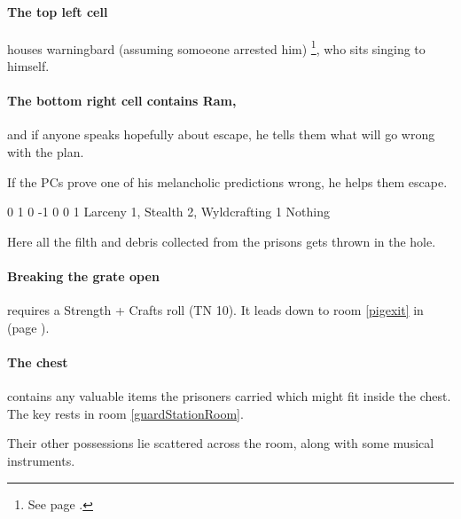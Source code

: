\begin{multicols}{2}
\begin{itemize}
\end{itemize}


\label{dunCells}

\paragraph{The top left cell}
houses \gls{warningbard} (assuming somoeone arrested him)%
\footnote{See page \pageref{warningbard}.},
who sits singing to himself.

\paragraph{The bottom right cell contains Ram,}
and if anyone speaks hopefully about escape, he tells them what will go wrong with the plan.

If the PCs prove one of his melancholic predictions wrong, he helps them escape.

{0}%
{1}%
{{0}%
{-1}%
{0}}%
{0}%
{1}%
{Larceny 1, Stealth 2, Wyldcrafting 1}%
{Nothing}%
{}

\label{dunGrate}

Here all the filth and debris collected from the prisons gets thrown in the hole.

\paragraph{Breaking the grate open}
requires a Strength + Crafts roll (TN 10).
It leads down to room \ref{pigexit} in \lowercase{} (page \pageref{pigexit}).

\label{thingsRoom}

\paragraph{The chest}
contains any valuable items the prisoners carried which might fit inside the chest.
The key rests in room \ref{guardStationRoom}.

Their other possessions lie scattered across the room, along with some musical instruments.

\label{ogreCell}


\end{multicols}
